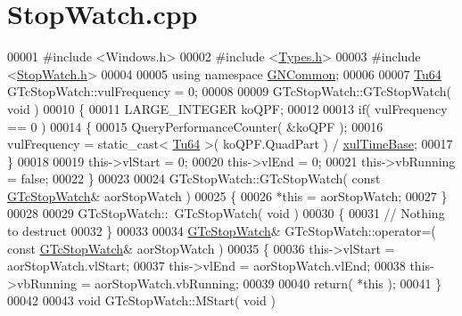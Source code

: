 \hypertarget{_stop_watch_8cpp_source}{}\section{Stop\+Watch.\+cpp}
\label{_stop_watch_8cpp_source}

\begin{DoxyCode}
00001 \textcolor{preprocessor}{#include <Windows.h>}
00002 \textcolor{preprocessor}{#include <\mbox{\hyperlink{_types_8h}{Types.h}}>}
00003 \textcolor{preprocessor}{#include <\mbox{\hyperlink{_stop_watch_8h}{StopWatch.h}}>}
00004 
00005 \textcolor{keyword}{using namespace }\mbox{\hyperlink{namespace_g_n_common}{GNCommon}};
00006 
00007 \mbox{\hyperlink{namespace_g_n_common_a9404ee6090c788ae70aebd1436ceb97d}{Tu64}} GTcStopWatch::vulFrequency = 0;
00008 
00009 GTcStopWatch::GTcStopWatch( \textcolor{keywordtype}{void} )
00010 \{
00011    LARGE\_INTEGER koQPF;
00012 
00013    \textcolor{keywordflow}{if}( vulFrequency == 0 )
00014    \{
00015       QueryPerformanceCounter( &koQPF );
00016       vulFrequency = \textcolor{keyword}{static\_cast<} \mbox{\hyperlink{namespace_g_n_common_a9404ee6090c788ae70aebd1436ceb97d}{Tu64}} \textcolor{keyword}{>}( koQPF.QuadPart ) / \mbox{\hyperlink{class_g_n_common_1_1_g_tc_stop_watch_a525b6eebced7d4d9c3812788cfde2b75}{xulTimeBase}};
00017    \}
00018 
00019    this->vlStart   = 0;
00020    this->vlEnd     = 0;
00021    this->vbRunning = \textcolor{keyword}{false};
00022 \}
00023 
00024 GTcStopWatch::GTcStopWatch( \textcolor{keyword}{const} \mbox{\hyperlink{class_g_n_common_1_1_g_tc_stop_watch}{GTcStopWatch}}& aorStopWatch )
00025 \{
00026    *\textcolor{keyword}{this} = aorStopWatch;
00027 \}
00028 
00029 GTcStopWatch::~GTcStopWatch( \textcolor{keywordtype}{void} )
00030 \{
00031    \textcolor{comment}{// Nothing to destruct}
00032 \}
00033 
00034 \mbox{\hyperlink{class_g_n_common_1_1_g_tc_stop_watch}{GTcStopWatch}}& GTcStopWatch::operator=( \textcolor{keyword}{const} \mbox{\hyperlink{class_g_n_common_1_1_g_tc_stop_watch}{GTcStopWatch}}& aorStopWatch )
00035 \{
00036    this->vlStart   = aorStopWatch.vlStart;
00037    this->vlEnd     = aorStopWatch.vlEnd;
00038    this->vbRunning = aorStopWatch.vbRunning;
00039 
00040    \textcolor{keywordflow}{return}( *\textcolor{keyword}{this} );
00041 \}
00042 
00043 \textcolor{keywordtype}{void} GTcStopWatch::MStart( \textcolor{keywordtype}{void} )

\end{DoxyCode}
